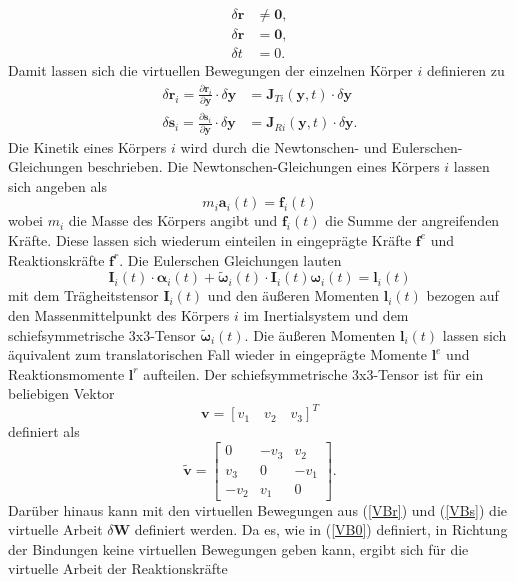 \begin{align}
\delta \pmb{r} &\neq \pmb{0},\\
\delta \pmb{r} &= \pmb{0},\label{VB0}\\
\delta t &= 0.
\end{align} 
Damit lassen sich die virtuellen Bewegungen der einzelnen Körper $i$ definieren zu
\begin{align}\label{VBr}
\delta \pmb{r}_i = \frac{\partial\pmb{r}_i}{\partial\pmb{y}}\cdot \delta\pmb{y} &= \pmb{J}_{Ti}(\pmb{y},t)\cdot\delta\pmb{y}\\
\delta \pmb{s}_i = \frac{\partial\pmb{s}_i}{\partial\pmb{y}}\cdot \delta\pmb{y} &= \pmb{J}_{Ri}(\pmb{y},t)\cdot\delta\pmb{y}.\label{VBs}
\end{align}
Die Kinetik eines Körpers $i$ wird durch die Newtonschen- und Eulerschen-Gleichungen beschrieben. 
Die Newtonschen-Gleichungen eines Körpers $i$ lassen sich angeben als
\begin{equation}\label{NewtonGl}
m_i \pmb{a}_i(t) = \pmb{f}_i(t)
\end{equation}
wobei $m_i$ die Masse des Körpers angibt und $\pmb{f}_i(t)$ die Summe der angreifenden Kräfte. Diese lassen sich wiederum einteilen in eingeprägte Kräfte $\pmb{f}^e$ und Reaktionskräfte $\pmb{f}^r$.
Die Eulerschen Gleichungen lauten
\begin{equation}\label{EulerGl}
\pmb{I}_i(t)\cdot\pmb{\alpha}_i(t) + \tilde{\pmb{\omega}}_i(t)\cdot \pmb{I}_i(t)\pmb{\omega}_i(t)= \pmb{l}_i(t)
\end{equation}
mit dem Trägheitstensor $\pmb{I}_i(t)$ und den äußeren Momenten $\pmb{l}_i(t)$ bezogen auf den Massenmittelpunkt des Körpers $i$ im Inertialsystem und dem schiefsymmetrische 3x3-Tensor $\tilde{\pmb{\omega}}_i(t)$. Die äußeren Momenten $\pmb{l}_i(t)$ lassen sich äquivalent zum translatorischen Fall wieder in eingeprägte Momente $\pmb{l}^e$ und Reaktionsmomente $\pmb{l}^r$ aufteilen. Der schiefsymmetrische 3x3-Tensor ist für ein beliebigen Vektor 
\begin{equation}
\pmb{v} = [v_1 \quad v_2 \quad v_3]^T
\end{equation}
definiert als
\begin{equation}
\tilde{\pmb{v}} = \begin{bmatrix} 0 & -v_3 & v_2 \\ v_3 & 0 & -v_1 \\ -v_2 & v_1 & 0 \end{bmatrix}.
\end{equation}
Darüber hinaus kann mit den virtuellen Bewegungen aus (\ref{VBr}) und (\ref{VBs}) die virtuelle Arbeit $\delta \pmb{W}$ definiert werden. Da es, wie in (\ref{VB0}) definiert, in Richtung der Bindungen keine virtuellen Bewegungen geben kann, ergibt sich für die virtuelle Arbeit der Reaktionskräfte
